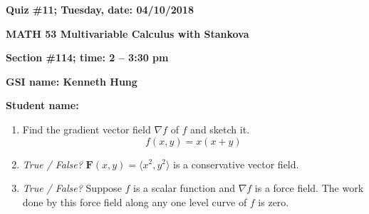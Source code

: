 \documentclass{article}
\begin{document}
{\bf Quiz \#11; Tuesday, date: 04/10/2018}

{\bf MATH 53 Multivariable Calculus with Stankova}

{\bf Section \#114; time: 2 -- 3:30 pm}

{\bf GSI name: Kenneth Hung}

{\bf Student name:}

\vspace*{0.25in}

\begin{enumerate}
\item Find the gradient vector field $\nabla f$ of $f$ and sketch it.
\[
f(x, y) = x(x+y)
\]

\item {\em True / False?} $\mathbf{F}(x, y) = \langle x^2, y^2 \rangle$ is a conservative vector field.

\item {\em True / False?} Suppose $f$ is a scalar function and $\nabla f$ is a force field. The work done by this force field along any one level curve of $f$ is zero.
\end{enumerate}
\end{document}
